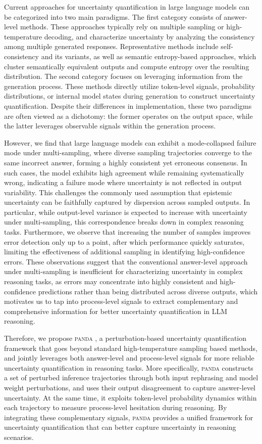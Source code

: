\documentclass{article} %
\DeclareRobustCommand{\method}{%
  \texorpdfstring{%
    \ifmmode\text{\normalfont\textsc{panda}}\else\textsc{panda}\xspace\fi
  }{PANDA}%
}
\begin{document}
Current approaches for uncertainty quantification in large language models can be categorized into two main paradigms. The first category consists of answer-level methods. These approaches typically rely on multiple sampling or high-temperature decoding, and characterize uncertainty by analyzing the consistency among multiple generated responses. Representative methods include self-consistency and its variants, as well as semantic entropy-based approaches, which cluster semantically equivalent outputs and compute entropy over the resulting distribution. The second category focuses on leveraging information from the generation process. These methods directly utilize token-level signals, probability distributions, or internal model states during generation to construct uncertainty quantification. Despite their differences in implementation, these two paradigms are often viewed as a dichotomy: the former operates on the output space, while the latter leverages observable signals within the generation process.

However, we find that large language models can exhibit a mode-collapsed failure mode under multi-sampling, where diverse sampling trajectories converge to the same incorrect answer, forming a highly consistent yet erroneous consensus. In such cases, the model exhibits high agreement while remaining systematically wrong, indicating a failure mode where uncertainty is not reflected in output variability. This challenges the commonly used assumption that epistemic uncertainty can be faithfully captured by dispersion across sampled outputs. In particular, while output-level variance is expected to increase with uncertainty under multi-sampling, this correspondence breaks down in complex reasoning tasks. Furthermore, we observe that increasing the number of samples improves error detection only up to a point, after which performance quickly saturates, limiting the effectiveness of additional sampling in identifying high-confidence errors. These observations suggest that the conventional answer-level approach under multi-sampling is insufficient for characterizing uncertainty in complex reasoning tasks, as errors may concentrate into highly consistent and high-confidence predictions rather than being distributed across diverse outputs, which motivates us to tap into process-level signals to extract complementary and comprehensive information for better uncertainty quantification in LLM reasoning.

Therefore, we propose \method{}, a perturbation-based uncertainty quantification framework that goes beyond standard high-temperature sampling based methods, and jointly leverages both answer-level and process-level signals for more reliable uncertainty quantification in reasoning tasks.
More specifically, \method{} constructs a set of perturbed inference trajectories through both input rephrasing and model weight perturbations, and uses their output disagreement to capture answer-level uncertainty. At the same time, it exploits token-level probability dynamics within each trajectory to measure process-level hesitation during reasoning. By integrating these complementary signals, \method{} provides a unified framework for uncertainty quantification that can better capture uncertainty in reasoning scenarios.
\end{document}
